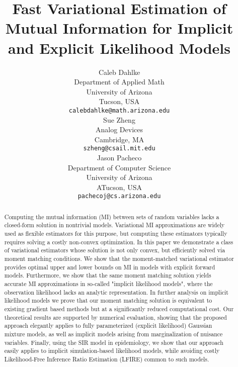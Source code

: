 \documentclass{article}
\title{Fast Variational Estimation of Mutual Information for Implicit and Explicit Likelihood Models}
\author{%
  Caleb Dahlke \\
  Department of Applied Math\\
  University of Arizona\\
  Tucson, USA \\
  \texttt{calebdahlke@math.arizona.edu} \\
  \And
  Sue Zheng\\
  Analog Devices \\
  Cambridge, MA \\
  \texttt{szheng@csail.mit.edu} \\
  \AND
  Jason Pacheco \\
  Department of Computer Science \\
  University of Arizona\\
  ATucson, USA \\
  \texttt{pachecoj@cs.arizona.edu} \\
}
\begin{document}
\maketitle


\begin{abstract}
  Computing the mutual information (MI) between sets of random
  variables lacks a closed-form solution in nontrivial
  models. Variational MI approximations are widely used as flexible
  estimators for this purpose, but computing these estimators
  typically requires solving a costly non-convex optimization.  In
  this paper we demonstrate a class of variational estimators whose
  solution is not only convex, but efficiently solved via moment
  matching conditions.  We show that the moment-matched variational
  estimator provides optimal upper and lower bounds on MI in models
  with explicit forward models.  Furthermore, we show that the same
  moment matching solution yields accurate MI approximations in
  so-called "implicit likelihood models", where the observation
  likelihood lacks an analytic representation.  In further analysis on
  implicit likelihood models we prove that our moment matching
  solution is equivalent to existing gradient based methods but at a
  significantly reduced computational cost. Our theoretical results
  are supported by numerical evaluation, showing that the proposed
  approach elegantly applies to fully parameterized (explicit
  likelihood) Gaussian mixture models, as well as implicit models
  arising from marginalization of nuisance variables.  Finally, using
  the SIR model in epidemiology, we show that our approach easily
  applies to implicit simulation-based likelihood models, while
  avoiding costly Likelihood-Free Inference Ratio Estimation (LFIRE)
  common to such models.
\end{abstract}
\end{document}
